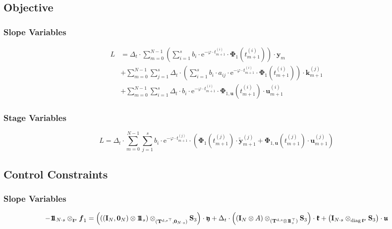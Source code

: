 \documentclass{article}
\newcommand{\tp}{\top}%
\newcommand{\kron}{\otimes}%
\newcommand{\dkron}[2][]{\mathbin{\kron_{#2}^{#1}}}%
\newcommand{\expe}{\mathrm{e}}%
\newcommand{\diag}{\mathop{\mathrm{diag}}}%
\newcommand{\vectorfont}[1]{\boldsymbol{#1}}%
\newcommand{\greekvectorfont}[1]{\boldsymbol{#1}}%
\newcommand{\matrixfont}[1]{\mathbf{#1}}%
\newcommand{\fvec}{\vectorfont{f}}
\newcommand{\kvec}{\vectorfont{k}}
\newcommand{\tvec}{\vectorfont{t}}
\newcommand{\uvec}{\vectorfont{u}}
\newcommand{\yvec}{\vectorfont{y}}
\newcommand{\tildeyvec}{\vectorfont{\tilde{y}}}
\newcommand{\Phivec}{\greekvectorfont{\Phi}}
\newcommand{\kfrakvec}{\vectorfont{\mathfrak{k}}}
\newcommand{\ufrakvec}{\vectorfont{\mathfrak{u}}}
\newcommand{\yfrakvec}{\vectorfont{\mathfrak{y}}}
\newcommand{\nullvec}{\greekvectorfont{0}}
\newcommand{\einsvec}{\vectorfont{1}\negthinspace\negthinspace\vectorfont{1}} %
\newcommand{\Imat}{\matrixfont{I}}%
\newcommand{\Smat}{\matrixfont{S}}
\newcommand{\Tmat}{\matrixfont{T}}
\begin{document}
\subsection*{Objective}
\subsubsection*{Slope Variables}
\begin{align*}
L &= \Delta_t \cdot \sum_{m=0}^{N-1} \left(\sum_{i=1}^s b_i \cdot \expe^{-\varphi \cdot t_{m+1}^{(i)}} \cdot \Phivec_1 (t_{m+1}^{(i)}) \right) \cdot \yvec_{m} \\
 &+ \sum_{m=0}^{N-1} \sum_{j=1}^s \Delta_t \cdot \left(\sum_{i=1}^s b_i \cdot a_{ij} \cdot \expe^{-\varphi \cdot t_{m+1}^{(i)}} \cdot \Phivec_1 (t_{m+1}^{(i)}) \right) \cdot \kvec_{m+1}^{(j)} \\
 &+ \sum_{m=0}^{N-1} \sum_{i=1}^s \Delta_t \cdot b_i \cdot \expe^{-\varphi \cdot t_{m+1}^{(i)}} \cdot \Phivec_{1,\uvec}(t_{m+1}^{(i)}) \cdot \uvec_{m+1}^{(i)}
\end{align*}

\subsubsection*{Stage Variables}
\[
L = \Delta_t \cdot \sum_{m=0}^{N-1} \sum_{j=1}^s b_i \cdot \expe^{-\varphi \cdot t_{m+1}^{(j)}} \cdot \left(\Phivec_1(t_{m+1}^{(j)})\cdot \tildeyvec_{m+1}^{(j)} + \Phivec_{1,\uvec}(t_{m+1}^{(j)}) \cdot \uvec_{m+1}^{(j)}\right) 
\]


\subsection*{Control Constraints}
\subsubsection*{Slope Variables}
\[
-\einsvec_{N\cdot s} \dkron{\tvec^{\mathrm{s}}} \fvec_1
 = \left( \left( (\Imat_{N}, \nullvec_N) \kron \einsvec_s\right) \dkron{({\Tmat^{\mathrm{d},\mathrm{s}}}^{\tp},\nullvec_{N \cdot s})} \Smat_3 \right) \cdot \yfrakvec
 + \Delta_t \cdot \left(  (\Imat_{N} \kron A) \dkron{(\Tmat^{\mathrm{d},\mathrm{s}} \kron \einsvec_s^{\tp})} \Smat_3 \right)\cdot \kfrakvec
 + \left(\Imat_{N \cdot s} \dkron{\diag \tvec^{\mathrm{s}}} \Smat_3  \right) \cdot \ufrakvec
\]
\end{document}
